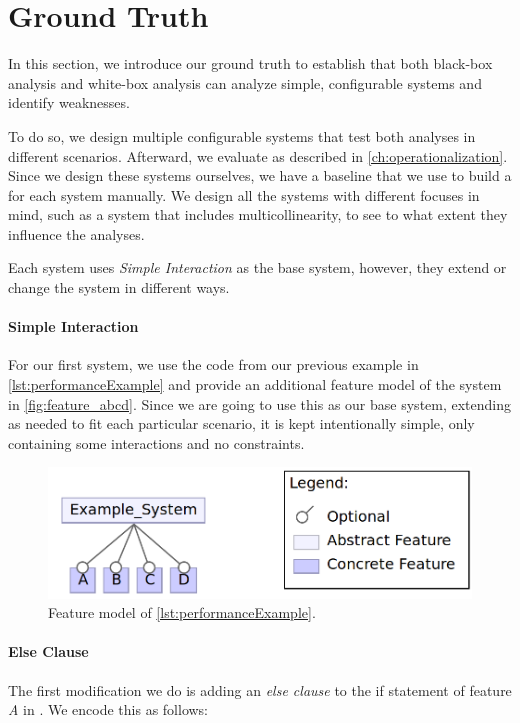 \section{Ground Truth}\label{sec:ground-truth}
In this section, we introduce our ground truth to establish that both black-box analysis 
and white-box analysis can analyze simple, configurable systems and identify weaknesses. 

To do so, we design multiple configurable systems that test both analyses in different scenarios. 
Afterward, we evaluate as described in \autoref{ch:operationalization}. 
Since we design these systems ourselves, we have a baseline that we use to build a {\perfInfluenceModel} for each system manually. 
We design all the systems with different focuses in mind, such as a system that includes multicollinearity, 
to see to what extent they influence the analyses. 

Each system uses \emph{Simple Interaction} as the base system, however, they extend or change the system in different ways.

\paragraph{Simple Interaction}\label{ground-truth:Simple}
For our first system, we use the code from our previous example in \autoref{lst:performanceExample} and provide an additional feature model 
of the system in \autoref{fig:feature_abcd}. 
Since we are going to use this as our base system, extending as needed to fit each
particular scenario, it is kept intentionally simple, only containing some interactions and no constraints.

\begin{figure}[h]
    \centering
    \includegraphics[scale=0.25]{gfx/Feature_ABCD.png}
    \caption{Feature model of \autoref{lst:performanceExample}.}
    \label{fig:feature_abcd}
\end{figure}


\paragraph{Else Clause}
The first modification we do is adding an \emph{else clause} to the if statement of feature \emph{A} in . 
We encode this as follows:

